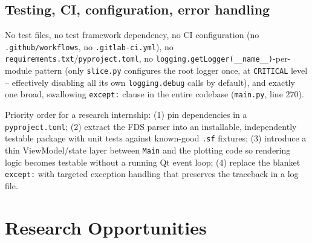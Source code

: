 \documentclass[11pt,a4paper]{report}
\begin{document}
\section{Testing, CI, configuration, error handling}
\begin{factbox}
No test files, no test framework dependency, no CI configuration (no \texttt{.github/workflows},
no \texttt{.gitlab-ci.yml}), no \texttt{requirements.txt}/\texttt{pyproject.toml}, no
\texttt{logging.getLogger(\_\_name\_\_)}-per-module pattern (only \texttt{slice.py} configures the
root logger once, at \texttt{CRITICAL} level -- effectively disabling all its own \texttt{logging.debug}
calls by default), and exactly one broad, swallowing \texttt{except:} clause in the entire codebase
(\texttt{main.py}, line 270).
\end{factbox}

\begin{recbox}
Priority order for a research internship: (1) pin dependencies in a \texttt{pyproject.toml}; (2)
extract the FDS parser into an installable, independently testable package with unit tests against
known-good \texttt{.sf} fixtures; (3) introduce a thin ViewModel/state layer between \texttt{Main} and
the plotting code so rendering logic becomes testable without a running Qt event loop; (4) replace the
blanket \texttt{except:} with targeted exception handling that preserves the traceback in a log file.
\end{recbox}

\chapter{Research Opportunities}
\end{document}
